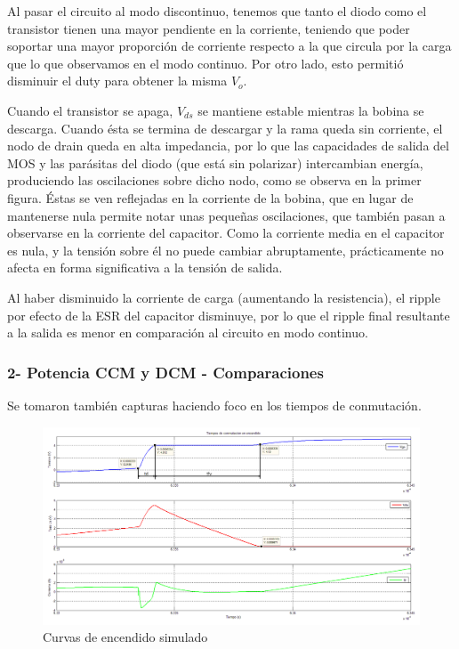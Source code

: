 \documentclass[e4_tp1_main.tex]{subfiles}
\begin{document}
Al pasar el circuito al modo discontinuo, tenemos que tanto el diodo como el transistor tienen una mayor pendiente en la corriente, teniendo que poder soportar una mayor proporción de corriente respecto a la que circula por la carga que lo que observamos en el modo continuo. Por otro lado, esto permitió disminuir el duty para obtener la misma $V_o$.
\par
Cuando el transistor se apaga, $V_{ds}$ se mantiene estable mientras la bobina se descarga. Cuando ésta se termina de descargar y la rama queda sin corriente, el nodo de drain queda en alta impedancia, por lo que las capacidades de salida del MOS y las parásitas del diodo (que está sin polarizar) intercambian energía, produciendo las oscilaciones sobre dicho nodo, como se observa en la primer figura. Éstas se ven reflejadas en la corriente de la bobina, que en lugar de mantenerse nula permite notar unas pequeñas oscilaciones, que también pasan a observarse en la corriente del capacitor. Como la corriente media en el capacitor es nula, y la tensión sobre él no puede cambiar abruptamente, prácticamente no afecta en forma significativa a la tensión de salida.
\par
Al haber disminuido la corriente de carga (aumentando la resistencia), el ripple por efecto de la ESR del capacitor disminuye, por lo que el ripple final resultante a la salida es menor en comparación al circuito en modo continuo.


\subsubsection*{2- Potencia CCM y DCM - Comparaciones}

Se tomaron también capturas haciendo foco en los tiempos de conmutación.

\begin{figure}[H]
\centering
\includegraphics[width=0.9\linewidth]{Imagenes/Punto4/tiempos_encendidoX.png}
\caption{Curvas de encendido simulado}
\end{figure}
\end{document}
